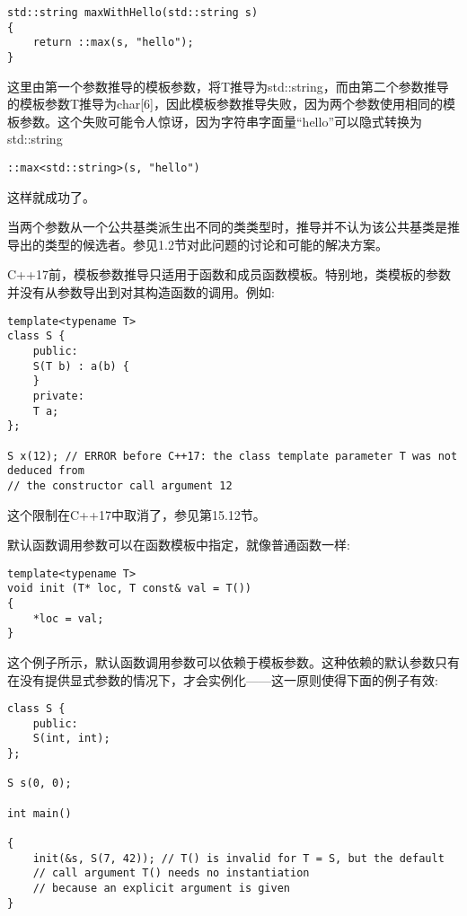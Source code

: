 \begin{lstlisting}[style=styleCXX]
std::string maxWithHello(std::string s)
{
	return ::max(s, "hello");
}
\end{lstlisting}

这里由第一个参数推导的模板参数，将T推导为std::string，而由第二个参数推导的模板参数T推导为char[6]，因此模板参数推导失败，因为两个参数使用相同的模板参数。这个失败可能令人惊讶，因为字符串字面量“hello”可以隐式转换为std::string

\begin{lstlisting}[style=styleCXX]
::max<std::string>(s, "hello")
\end{lstlisting}

这样就成功了。

当两个参数从一个公共基类派生出不同的类类型时，推导并不认为该公共基类是推导出的类型的候选者。参见1.2节对此问题的讨论和可能的解决方案。


C++17前，模板参数推导只适用于函数和成员函数模板。特别地，类模板的参数并没有从参数导出到对其构造函数的调用。例如:

\begin{lstlisting}[style=styleCXX]
template<typename T>
class S {
	public:
	S(T b) : a(b) {
	}
	private:
	T a;
};

S x(12); // ERROR before C++17: the class template parameter T was not deduced from
// the constructor call argument 12
\end{lstlisting}

这个限制在C++17中取消了，参见第15.12节。


默认函数调用参数可以在函数模板中指定，就像普通函数一样:

\begin{lstlisting}[style=styleCXX]
template<typename T>
void init (T* loc, T const& val = T())
{
	*loc = val;
}
\end{lstlisting}

这个例子所示，默认函数调用参数可以依赖于模板参数。这种依赖的默认参数只有在没有提供显式参数的情况下，才会实例化——这一原则使得下面的例子有效:

\begin{lstlisting}[style=styleCXX]
class S {
	public:
	S(int, int);
};

S s(0, 0);

int main()

{
	init(&s, S(7, 42)); // T() is invalid for T = S, but the default
	// call argument T() needs no instantiation
	// because an explicit argument is given
}
\end{lstlisting}

